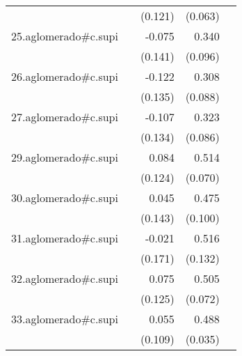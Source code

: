 {\begin{longtable}{l*{4}{D{.}{.}{-1}}}
            &                     &     (0.121)         &     (0.063)         &                     \\
\addlinespace
25.aglomerado#c.supi&                     &      -0.075         &       0.340\sym{***}&                     \\
            &                     &     (0.141)         &     (0.096)         &                     \\
\addlinespace
26.aglomerado#c.supi&                     &      -0.122         &       0.308\sym{***}&                     \\
            &                     &     (0.135)         &     (0.088)         &                     \\
\addlinespace
27.aglomerado#c.supi&                     &      -0.107         &       0.323\sym{***}&                     \\
            &                     &     (0.134)         &     (0.086)         &                     \\
\addlinespace
29.aglomerado#c.supi&                     &       0.084         &       0.514\sym{***}&                     \\
            &                     &     (0.124)         &     (0.070)         &                     \\
\addlinespace
30.aglomerado#c.supi&                     &       0.045         &       0.475\sym{***}&                     \\
            &                     &     (0.143)         &     (0.100)         &                     \\
\addlinespace
31.aglomerado#c.supi&                     &      -0.021         &       0.516\sym{***}&                     \\
            &                     &     (0.171)         &     (0.132)         &                     \\
\addlinespace
32.aglomerado#c.supi&                     &       0.075         &       0.505\sym{***}&                     \\
            &                     &     (0.125)         &     (0.072)         &                     \\
\addlinespace
33.aglomerado#c.supi&                     &       0.055         &       0.488\sym{***}&                     \\
            &                     &     (0.109)         &     (0.035)         &                     \\

\end{longtable}}
